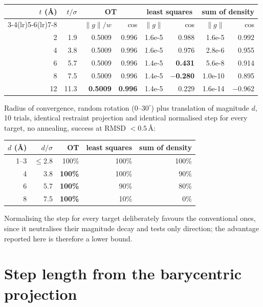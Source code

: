 \documentclass[11pt,a4paper]{article}
\begin{document}
\begin{table}[h]\centering\small
\begin{tabular}{@{}rrrrrrrr@{}}\toprule
$t$ (\AA) & $t/\sigma$ & \multicolumn{2}{c}{OT} & \multicolumn{2}{c}{least squares}
 & \multicolumn{2}{c}{sum of density}\\
\cmidrule(lr){3-4}\cmidrule(lr){5-6}\cmidrule(lr){7-8}
 & & $\lVert g\rVert/w$ & cos & $\lVert g\rVert$ & cos & $\lVert g\rVert$ & cos\\\midrule
 2 & 1.9 & 0.5009 & 0.996 & 1.6e-5 & 0.988 & 1.6e-5 & 0.992\\
 4 & 3.8 & 0.5009 & 0.996 & 1.6e-5 & 0.976 & 2.8e-6 & 0.955\\
 6 & 5.7 & 0.5009 & 0.996 & 1.4e-5 & \textbf{0.431} & 5.6e-8 & 0.914\\
 8 & 7.5 & 0.5009 & 0.996 & 1.4e-5 & \textbf{$-$0.280} & 1.0e-10 & 0.895\\
12 & 11.3 & \textbf{0.5009} & \textbf{0.996} & 1.4e-5 & 0.229 & 1.6e-14 & $-$0.962\\
\bottomrule\end{tabular}
\end{table}

Radius of convergence, random rotation ($0$--$30^\circ$) plus translation of magnitude $d$,
10 trials, identical restraint projection and identical normalised step for every target,
no annealing, success at RMSD $<0.5$\,\AA:

\begin{table}[h]\centering\small
\begin{tabular}{@{}rrrrr@{}}\toprule
$d$ (\AA) & $d/\sigma$ & OT & least squares & sum of density\\\midrule
1--3 & $\le$2.8 & 100\% & 100\% & 100\%\\
4 & 3.8 & \textbf{100\%} & 100\% & 90\%\\
6 & 5.7 & \textbf{100\%} & 90\% & 80\%\\
8 & 7.5 & \textbf{100\%} & 10\% & 0\%\\
\bottomrule\end{tabular}
\end{table}

Normalising the step for every target deliberately favours the conventional ones, since it
neutralises their magnitude decay and tests only direction; the advantage reported here is
therefore a lower bound.

\section{Step length from the barycentric projection}\label{sec:step}
\end{document}
